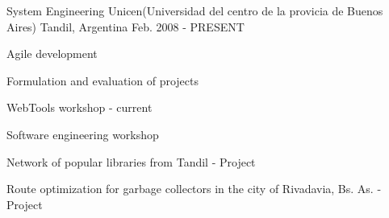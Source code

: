 


\begin{cventries}


\cventry
{System Engineering} %
{Unicen(Universidad del centro de la provicia de Buenos Aires)} %
{Tandil, Argentina} %
{Feb. 2008 - PRESENT} %
{ %
\begin{cvitems}
\item {Agile development}
\item {Formulation and evaluation of projects}
\item {WebTools workshop - current}
\item {Software engineering workshop}
\item {Network of popular libraries from Tandil - Project}
\item {Route optimization for garbage collectors in the city of Rivadavia, Bs. As. - Project}
\end{cvitems}
}


\end{cventries}
